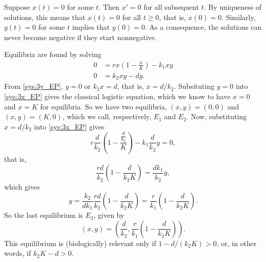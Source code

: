 \documentclass[12pt]{exam}
\begin{document}
\begin{questions}
\begin{parts}
\begin{solution}
Suppose $x(t)=0$ for some $t$. Then $x'=0$ for all subsequent $t$. By uniqueness of solutions, this means that $x(t)=0$ for all $t\geq 0$, that is, $x(0)=0$.
Similarly, $y(t)=0$ for some $t$ implies that $y(0)=0$.
As a consequence, the solutions can never become negative if they start nonnegative.

Equilibria are found by solving 
\begin{subequations}\label{sys:3_EP}
\begin{align}
0 &= rx\left(1-\frac xK\right)-k_1xy \label{sys:3x_EP} \\
0 &= k_2xy-dy. \label{sys:3y_EP}
\end{align}
\end{subequations}
From \eqref{sys:3y_EP}, $y=0$ or $k_2x=d$, that is, $x=d/k_2$. Subsituting $y=0$ into \eqref{sys:3x_EP} gives the classical logistic equation, which we know to have $x=0$ and $x=K$ for equilibria. So we have two equilibria, $(x,y)=(0,0)$ and $(x,y)=(K,0)$, which we call, respectively, $E_1$ and $E_2$. Now, substituting $x=d/k_2$ into \eqref{sys:3x_EP} gives
\[
r\frac{d}{k_2}\left(1-\frac{\frac{d}{k_2}}K\right)-k_1\frac{d}{k_2}y=0,
\]
that is,
\[
\frac{rd}{k_2}\left(1-\frac{d}{k_2K}\right)=\frac{dk_1}{k_2}y,
\]
which gives
\[
y=\frac{k_2}{dk_1}\frac{rd}{k_2}\left(1-\frac{d}{k_2K}\right)
=\frac{r}{k_1}\left(1-\frac{d}{k_2K}\right).
\]
So the last equilibrium is $E_3$, given by
\[
(x,y)=\left(\frac{d}{k_2},\frac{r}{k_1}\left(1-\frac{d}{k_2K}\right)\right).
\]
This equilibrium is (biologically) relevant only if $1-d/(k_2K)>0$, or, in other words, if $k_2K-d>0$.


\end{solution}
\end{parts}
\end{questions}
\end{document}
